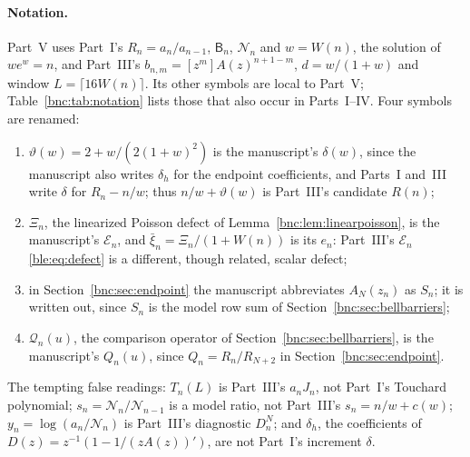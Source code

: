 \documentclass[11pt]{article}
\numberwithin{equation}{section}
\theoremstyle{definition}
\theoremstyle{remark}
\begin{document}
\paragraph{Notation.}
Part~V uses Part~I's $R_n=a_n/a_{n-1}$, $\mathsf B_n$, $\mathcal N_n$
and $w=W(n)$, the solution of $we^w=n$, and Part~III's
$b_{n,m}=[z^m]A(z)^{n+1-m}$, $d=w/(1+w)$ and window
$L=\lceil16W(n)\rceil$. Its other symbols are local to Part~V;
Table~\ref{bnc:tab:notation} lists those that also occur in
Parts~I--IV. Four symbols are renamed:
\begin{enumerate}[nosep]
\item $\vartheta(w)=2+w/(2(1+w)^2)$ is the manuscript's $\delta(w)$,
since the manuscript also writes $\delta_h$ for the endpoint coefficients,
and Parts~I and~III write $\delta$ for $R_n-n/w$; thus
$n/w+\vartheta(w)$ is Part~III's candidate $R(n)$;
\item $\Xi_n$, the linearized Poisson defect of
Lemma~\ref{bnc:lem:linearpoisson}, is the manuscript's $\mathcal E_n$,
and $\bar\xi_n=\Xi_n/(1+W(n))$ is its $e_n$: Part~III's $\mathcal E_n$
\eqref{ble:eq:defect} is a different, though related, scalar defect;
\item in Section~\ref{bnc:sec:endpoint} the manuscript abbreviates
$A_N(z_n)$ as $S_n$; it is written out, since $S_n$ is the model row sum
of Section~\ref{bnc:sec:bellbarriers};
\item $\mathcal Q_n(u)$, the comparison operator of
Section~\ref{bnc:sec:bellbarriers}, is the manuscript's $Q_n(u)$, since
$Q_n=R_n/R_{N+2}$ in Section~\ref{bnc:sec:endpoint}.
\end{enumerate}
The tempting false readings: $T_n(L)$ is Part~III's $a_nJ_n$, not
Part~I's Touchard polynomial; $s_n=\mathcal N_n/\mathcal N_{n-1}$ is a
model ratio, not Part~III's $s_n=n/w+c(w)$; $y_n=\log(a_n/\mathcal N_n)$
is Part~III's diagnostic $D_n^N$; and $\delta_h$, the coefficients of
$D(z)=z^{-1}(1-1/(zA(z))')$, are not Part~I's increment $\delta$.
\end{document}
